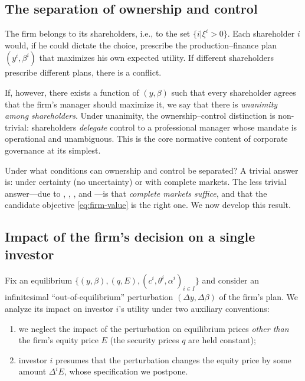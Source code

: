 \documentclass[11pt,a4paper,oneside]{book}
\theoremstyle{plain}
\theoremstyle{definition}
\theoremstyle{remark}
\numberwithin{equation}{chapter}
\begin{document}
\subsection{The separation of ownership and control}

The firm belongs to its shareholders, i.e., to the set $\{ i \vert \xi^i > 0 \}$.
Each shareholder $i$ would, if he could dictate the choice, prescribe the production--finance plan $(y^i, \beta^i)$ that maximizes his own expected utility.
If different shareholders prescribe different plans, there is a conflict.

If, however, there exists a function of $(y, \beta)$ such that every shareholder agrees that the firm's manager should maximize it, we say that there is \emph{unanimity among shareholders}.
Under unanimity, the ownership--control distinction is non-trivial: shareholders \emph{delegate} control to a professional manager whose mandate is operational and unambiguous.
This is the core normative content of corporate governance at its simplest.

Under what conditions can ownership and control be separated?
A trivial answer is: under certainty (no uncertainty) or with complete markets.
The less trivial answer---due to \citet{Fisher1930}, \citet{Dreze1974}, \citet{GrossmanHart1979}, and \citet{GrossmanStiglitz1980}---is that \emph{complete markets suffice}, and that the candidate objective \eqref{eq:firm-value} is the right one.
We now develop this result.

\subsection{Impact of the firm's decision on a single investor}

Fix an equilibrium $\{ (y, \beta), (q, E), (c^i, \theta^i, \alpha^i)_{i \in I} \}$ and consider an infinitesimal ``out-of-equilibrium'' perturbation $(\Delta y, \Delta \beta)$ of the firm's plan.
We analyze its impact on investor $i$'s utility under two auxiliary conventions:
\begin{enumerate}
  \item we neglect the impact of the perturbation on equilibrium prices \emph{other than} the firm's equity price $E$ (the security prices $q$ are held constant);
  \item investor $i$ presumes that the perturbation changes the equity price by some amount $\Delta^i E$, whose specification we postpone.
\end{enumerate}
\end{document}
